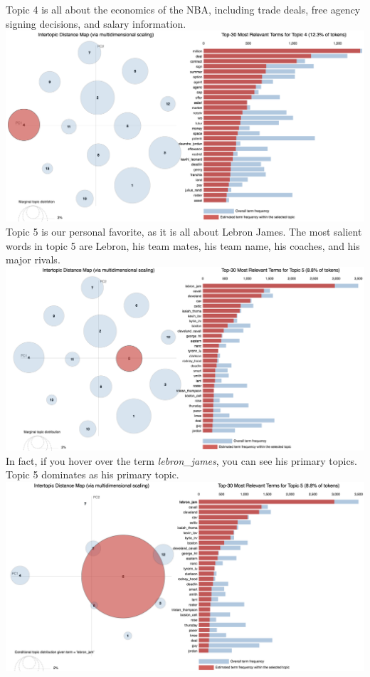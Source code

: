 \documentclass[11pt]{article}
\begin{document}
Topic 4 is all about the economics of the NBA, including trade deals, free agency signing decisions, and salary information.\\
\includegraphics[width=470pt]{4.png} \\

Topic 5 is our personal favorite, as it is all about Lebron James.  The most salient words in topic 5 are Lebron, his team mates, his team name, his coaches, and his major rivals.  \\
\includegraphics[width=470pt]{5.png} \\

In fact, if you hover over the term \textit{lebron\_james}, you can see his primary topics. Topic 5 dominates as his primary topic. \\ 
\includegraphics[width=470pt]{6_lebron.png} \\
\end{document}
